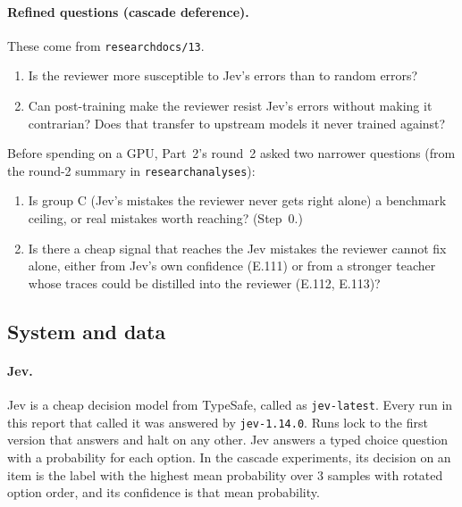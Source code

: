 \documentclass[11pt]{article}
\renewcommand{\_}{\origunderscore\allowbreak}
\begin{document}
\paragraph{Refined questions (cascade deference).} These come from \texttt{research\_docs/13}.
\begin{enumerate}[label=\textbf{Part \arabic*.},leftmargin=*,itemsep=2pt]
  \item Is the reviewer more susceptible to Jev's errors than to random errors?
  \item Can post-training make the reviewer resist Jev's errors without making it contrarian? Does that transfer to upstream models it never trained against?
\end{enumerate}
Before spending on a GPU, Part~2's round~2 asked two narrower questions (from the round-2 summary in \texttt{research\_analyses}):
\begin{enumerate}[label=\textbf{R2.\arabic*.},leftmargin=*,itemsep=2pt]
  \item Is group C (Jev's mistakes the reviewer never gets right alone) a benchmark ceiling, or real mistakes worth reaching? (Step~0.)
  \item Is there a cheap signal that reaches the Jev mistakes the reviewer cannot fix alone, either from Jev's own confidence (E.111) or from a stronger teacher whose traces could be distilled into the reviewer (E.112, E.113)?
\end{enumerate}

\subsection{System and data}\label{sec:system}

\paragraph{Jev.} Jev is a cheap decision model from TypeSafe, called as \texttt{jev-latest}. Every run in this report that called it was answered by \texttt{jev-1.14.0}. Runs lock to the first version that answers and halt on any other. Jev answers a typed choice question with a probability for each option. In the cascade experiments, its decision on an item is the label with the highest mean probability over 3 samples with rotated option order, and its confidence is that mean probability.
\end{document}
